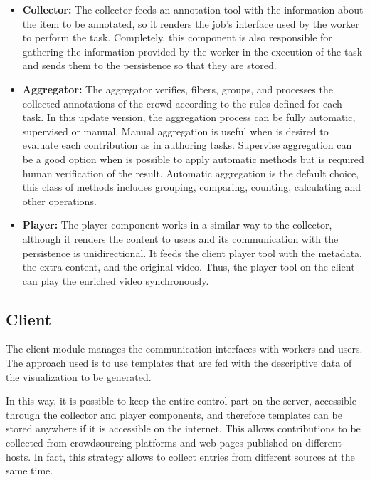 \begin{itemize}
\item \textbf{Collector: } The collector feeds an annotation tool with the information about the item to be annotated, so it renders the job's interface used by the worker to perform the task. Completely, this component is also responsible for gathering the information provided by the worker in the execution of the task and sends them to the persistence so that they are stored.

\item \textbf{Aggregator: }The aggregator verifies, filters, groups, and processes the collected annotations of the crowd according to the rules defined for each task. In this update version, the aggregation process can be fully automatic, supervised or manual. Manual aggregation is useful when is desired to evaluate each contribution as in authoring tasks. Supervise aggregation can be a good option when is possible to apply automatic methods but is required human verification of the result. Automatic aggregation is the default choice, this class of methods includes grouping, comparing, counting, calculating and other operations.

\item \textbf{Player: } The player component works in a  similar way to the collector, although it renders the content to users and its communication with the persistence is unidirectional. It feeds the client player tool with the metadata, the extra content, and the original video. Thus, the player tool on the client can play the enriched video synchronously.
\end{itemize}


\subsection{Client}
The client module manages the communication interfaces with workers and users. The approach used is to use templates that are fed with the descriptive data of the visualization to be generated.

In this way, it is possible to keep the entire control part on the server, accessible through the collector and player components, and therefore templates can be stored anywhere if it is accessible on the internet. This allows contributions to be collected from crowdsourcing platforms and web pages published on different hosts. In fact, this strategy allows to collect entries from different sources at the same time.

